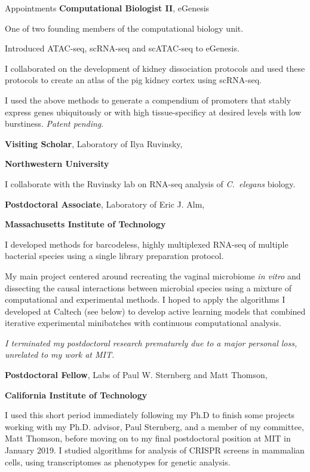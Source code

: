 \begin{rubric}{Appointments}
\entry*[11/2019 -]
	\textbf{Computational Biologist II}, eGenesis\par
	One of two founding members of the computational biology unit.\par
	Introduced ATAC-seq, scRNA-seq and scATAC-seq to eGenesis.\par
	I collaborated on the development of kidney dissociation protocols and used
	these protocols to create an atlas of the pig kidney cortex using scRNA-seq.\par
	I used the above methods to generate a compendium of promoters that stably
	express genes ubiquitously or with high tissue-specificy at desired levels with
	low burstiness. \textit{Patent pending}.

\entry*[7/2020 -]
	\textbf{Visiting Scholar}, Laboratory of Ilya Ruvinsky,\par
	\textbf{Northwestern University}\par
	I collaborate with the Ruvinsky lab on RNA-seq analysis of \textit{C.~elegans}
	biology.

\entry*[01/2019--11/2019]
		\textbf{Postdoctoral Associate}, Laboratory of Eric J. Alm,\par
		\textbf{Massachusetts Institute of Technology}\par
		I developed methods for barcodeless, highly multiplexed RNA-seq of multiple
		bacterial species using a single library preparation protocol. \par
		My main project centered around recreating the vaginal microbiome \textit{in
		vitro} and dissecting the causal interactions between microbial species
		using a mixture of computational and experimental methods. I hoped to apply
		the algorithms I developed at Caltech (see below) to develop active learning
		models that combined iterative experimental minibatches with continuous
		computational analysis.\par
		\textit{I terminated my postdoctoral research prematurely due to a major
		personal loss, unrelated to my work at MIT.}

\entry*[11/2018--01/2019]
		\textbf{Postdoctoral Fellow}, Labs of Paul W. Sternberg and Matt Thomson,\par
		\textbf{California Institute of Technology}\par
		I used this short period immediately following my Ph.D to finish some
		projects working with my Ph.D. advisor, Paul Sternberg, and a member of my
		committee, Matt Thomson, before moving on to my final postdoctoral position
		at MIT in January 2019. I studied algorithms for analysis of CRISPR screens
		in mammalian cells, using transcriptomes as phenotypes for genetic analysis.

\end{rubric}
